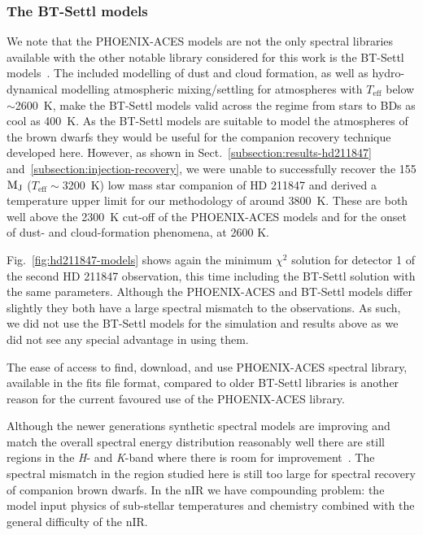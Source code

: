 \documentclass[fleqn,usenatbib]{mnras}
\begin{document}
\subsubsection{The {BT-Settl} models}
\label{subsubsec:BT-Settl}
We note that the PHOENIX-ACES models are not the only spectral libraries available with the other notable library considered for this work is the {BT-Settl} models~\citep{allard_model_2010,allard_btsettl_2013,baraffe_new_2015}. The included modelling of dust and cloud formation, as well as hydro-dynamical modelling atmospheric mixing/settling for atmospheres with \(T_{\textrm{eff}}\) below \(\sim\)2600~K, make the {BT-Settl} models valid across the regime from stars to BDs as cool as 400~K. As the {BT-Settl} models are suitable to model the atmospheres of the brown dwarfs they would be useful for the companion recovery technique developed here. However, as shown in Sect.~\ref{subsection:results-hd211847} and~\ref{subsection:injection-recovery}, we were unable to successfully recover the 155 \(\rm M_J\) (\(T_{\textrm{eff}}\sim\)3200~K) low mass star companion of {HD 211847} and derived a temperature upper limit for our methodology of around 3800~K. These are both well above the 2300~K cut-off of the PHOENIX-ACES models and for the onset of dust- and cloud-formation phenomena, at 2600 K.

Fig.~\ref{fig:hd211847-models} shows again the minimum \(\chi^2\) solution for detector 1 of the second {HD 211847} observation, this time including the {BT-Settl} solution with the same parameters. Although the PHOENIX-ACES and {BT-Settl} models differ slightly they both have a large spectral mismatch to the observations. As such, we did not use the {BT-Settl} models for the simulation and results above as we did not see any special advantage in using them.

The ease of access to find, download, and use PHOENIX-ACES spectral library, available in the fits file format, compared to older {BT-Settl} libraries is another reason for the current favoured use of the PHOENIX-ACES library.

Although the newer generations synthetic spectral models are improving and match the overall spectral energy distribution reasonably well there are still regions in the \textit{H}- and \textit{K}-band where there is room for improvement~\citet{rajpurohit_spectral_2016}. The spectral mismatch in the region studied here is still too large for spectral recovery of companion brown dwarfs. In the nIR we have compounding problem: the model input physics of sub-stellar temperatures and chemistry combined with the general difficulty of the nIR.
\end{document}
